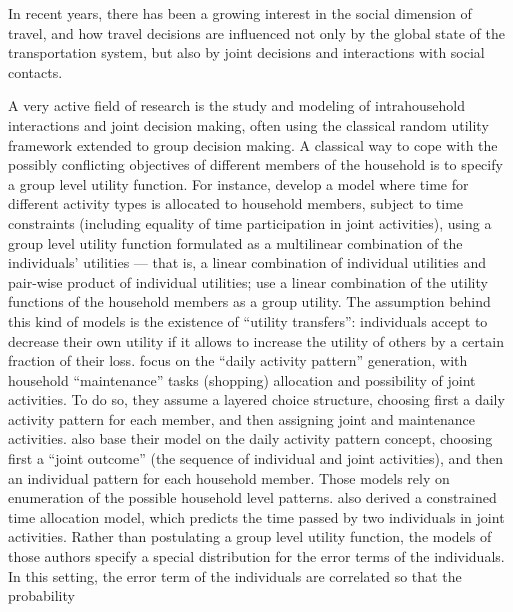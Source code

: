 {In recent years, there has been a growing interest in the social dimension of travel,
and how travel decisions are influenced not only by the global state of the transportation system,
but also by joint decisions and interactions with social contacts.

A very active field of research is the study and modeling of intrahousehold interactions
and joint decision making, %
often using the classical random utility framework extended to group decision making.
%
A classical way to cope with the possibly conflicting objectives of different members of the household
is to specify a group level utility function.
%
For instance,
develop a model where time for different activity types is allocated to household members,
subject to time constraints (including equality of time participation in joint activities),
using a group level utility function formulated as a multilinear combination of the individuals'
utilities --- that is, a linear combination of individual utilities and pair-wise
product of individual utilities;
%
use a linear combination of the utility functions of the household members as a group utility.
The assumption behind this kind of models is the existence of ``utility transfers'':
individuals accept to decrease their own utility if it allows to increase
the utility of others by a certain fraction of their loss.
%
focus on the ``daily activity pattern'' generation,
with household ``maintenance'' tasks (\eg shopping) allocation and possibility of joint activities.
To do so, they assume a layered choice structure,
choosing first a daily activity pattern for each member,
and then assigning joint and maintenance activities.
%
 also base their model on the daily activity pattern concept,
choosing first a ``joint outcome'' (the sequence of individual and joint activities),
and then an individual pattern for each household member.
Those models rely on enumeration of the possible household level patterns.
%
also derived a constrained time allocation model,
which predicts the time passed by two individuals in joint activities.
Rather than postulating a group level utility function,
the models of those authors specify a special distribution for the error terms of the individuals.
In this setting,
the error term of the individuals are correlated so that the probability
}
